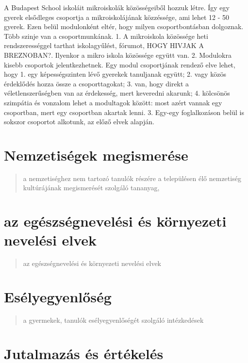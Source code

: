 A Budapest School iskoláit mikroiskolák közösségeiből hozzuk létre. Így
egy gyerek elsődleges csoportja a mikroiskolájának közzéssége, ami lehet
12 - 50 gyerek. Ezen belül modulonként eltér, hogy milyen
csoportbontásban dolgoznak. Több szinje van a csoportmunkának. 1. A
mikroiskola közössége heti rendszerességgel tarthat iskolagyűlést,
fórumot, HOGY HIVJAK A BREZNOBAN?. Ilyenkor a mikro iskola közössége
együtt van. 2. Modulokra kisebb csoportok jelentkezhetnek. Egy modul
csoportjának rendező elve lehet, hogy 1. egy képességszinten lévő
gyerekek tanuljanak együtt; 2. vagy közös érdeklődés hozza össze a
csoporttagokat; 3. van, hogy direkt a véletlenszerűségben van az
érdekesség, mert keveredni akarunk; 4. kölcsönös szimpátia és vonzalom
lehet a modultagok között: most azért vannak egy csoportban, mert egy
csoportban akartak lenni. 3. Egy-egy foglalkozáson belül is sokszor
csoportot alkotunk, az előző elvek alapján.

\section{Nemzetiségek
megismerése}\label{nemzetisuxe9gek-megismeruxe9se}

\begin{quote}
a nemzetiséghez nem tartozó tanulók részére a településen élő nemzetiség
kultúrájának megismerését szolgáló tananyag,
\end{quote}

\section{az egészségnevelési és környezeti nevelési
elvek}\label{az-eguxe9szsuxe9gneveluxe9si-uxe9s-kuxf6rnyezeti-neveluxe9si-elvek}

\begin{quote}
az egészségnevelési és környezeti nevelési elvek
\end{quote}

\section{Esélyegyenlőség}\label{esuxe9lyegyenlux151suxe9g}

\begin{quote}
a gyermekek, tanulók esélyegyenlőségét szolgáló intézkedések
\end{quote}

\section{Jutalmazás és
értékelés}\label{jutalmazuxe1s-uxe9s-uxe9rtuxe9keluxe9s}

